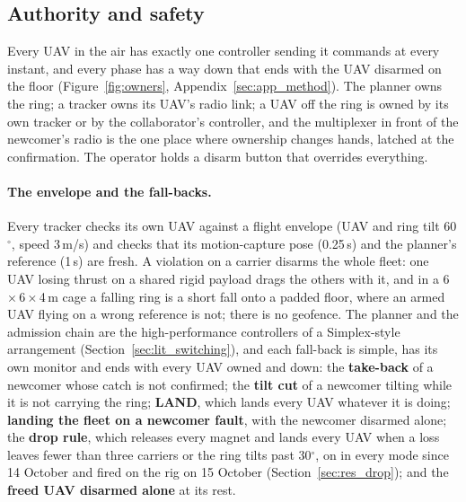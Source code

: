 
\subsection{Authority and safety}
\label{sec:safety}

Every UAV in the air has exactly one controller sending it commands at every instant, and every phase has a way
down that ends with the UAV disarmed on the floor (Figure~\ref{fig:owners}, Appendix~\ref{sec:app_method}). The planner owns the ring; a tracker owns
its UAV's radio link; a UAV off the ring is owned by its own tracker or by the collaborator's controller, and the
multiplexer in front of the newcomer's radio is the one place where ownership changes hands, latched at the
confirmation. The operator holds a disarm button that overrides everything.



\paragraph{The envelope and the fall-backs.} Every tracker checks its own UAV against a flight envelope (UAV and
ring tilt 60$^\circ$, speed 3\,m/s) and checks that its motion-capture pose (0.25\,s) and the planner's reference
(1\,s) are fresh. A violation on a carrier disarms the whole fleet: one UAV losing thrust on a shared rigid payload drags
the others with it, and in a 6\,$\times$\,6\,$\times$\,4\,m cage a falling ring is a short fall onto a padded floor,
where an armed UAV flying on a wrong reference is not; there is no geofence. The planner and the admission chain are
the high-performance controllers of a Simplex-style arrangement (Section~\ref{sec:lit_switching}), and each fall-back
is simple, has its own monitor and ends with every UAV owned and down: the \textbf{take-back} of a newcomer whose catch
is not confirmed; the \textbf{tilt cut} of a newcomer tilting while it is not carrying the ring; \textbf{LAND}, which
lands every UAV whatever it is doing; \textbf{landing the fleet on a newcomer fault}, with the newcomer disarmed alone;
the \textbf{drop rule}, which releases every magnet and lands every UAV when a loss leaves fewer than three carriers or
the ring tilts past 30$^\circ$, on in every mode since 14 October and fired on the rig on 15 October
(Section~\ref{sec:res_drop}); and the \textbf{freed UAV disarmed alone} at its rest.

